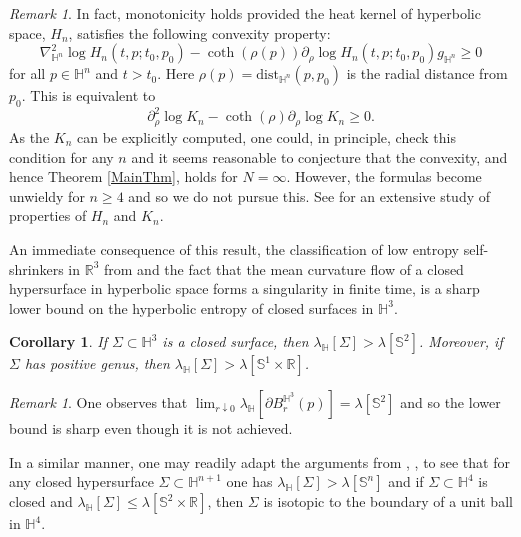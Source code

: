 \documentclass{amsart}
\newtheorem{cor}[thm]{Corollary}
\theoremstyle{definition}
\theoremstyle{remark}
\newtheorem{rem}[thm]{Remark}
\numberwithin{equation}{section}
\newcommand{\Real}{\mathbb R}
\newcommand{\dist}[0]{\mathrm{dist}}
\begin{document}
\begin{rem}
	In fact,  monotonicity holds provided the heat kernel of hyperbolic space, $H_n$, satisfies the following convexity property:
	$$
	 \nabla^2_{\mathbb{H}^n} \log H_n(t,p; t_0, p_0) - \coth(\rho(p)) \partial_\rho \log H_n(t,p; t_0, p_0) g_{\mathbb{H}^n}\geq 0
	$$
	for all $p\in \mathbb{H}^n$ and $t>t_0$.  Here $\rho(p)=\dist_{\mathbb{H}^n}(p,p_0)$ is the radial distance from $p_0$.  This is equivalent to
	$$
	\partial^2_\rho \log K_n -\coth(\rho)\partial_\rho \log K_n \geq 0.
	$$
	As the $K_n$ can be explicitly computed, one could, in principle, check this condition for any $n$ and it seems reasonable to conjecture that the convexity, and hence Theorem \ref{MainThm}, holds for $N=\infty$.  However, the formulas become unwieldy for $n\geq 4$ and so we do not pursue this. See \cite{daviesHeatKernelBounds1988} for an extensive study of properties of $H_n$ and $K_n$.
\end{rem}
	An immediate consequence of this result, the classification of low entropy self-shrinkers in $\Real^3$ from \cite{BernsteinWang2} and the fact that the mean curvature flow of a closed hypersurface in hyperbolic space forms a singularity in finite time, is a sharp lower bound on the hyperbolic entropy of closed surfaces in $\mathbb{H}^3$.
\begin{cor}
	If $\Sigma\subset \mathbb{H}^3$ is a closed surface, then $\lambda_{\mathbb{H}}[\Sigma]> \lambda[\mathbb{S}^2]$.  Moreover, if $\Sigma$ has positive genus, then $\lambda_{\mathbb{H}}[\Sigma]> \lambda[\mathbb{S}^1\times \Real]$.
\end{cor}	
\begin{rem}
	One observes that $\lim_{r\downarrow 0} \lambda_{\mathbb{H}}[\partial B_{r}^{\mathbb{H}^3}(p)] =\lambda[\mathbb{S}^2]$ and so the lower bound is sharp even though it is not achieved.  
\end{rem}
In a similar manner, one may readily adapt the arguments from \cite{BernsteinWang1}, \cite{JZhu}, \cite{BWIsotopy} to see that for any closed hypersurface $\Sigma\subset \mathbb{H}^{n+1}$ one has $\lambda_{\mathbb{H}} [\Sigma]> \lambda[\mathbb{S}^n]$ and if $\Sigma\subset \mathbb{H}^4$ is closed and $\lambda_{\mathbb{H}}[\Sigma]\leq \lambda[\mathbb{S}^2\times \Real]$, then $\Sigma$ is isotopic to the boundary of a unit ball in $\mathbb{H}^4$.
\end{document}
